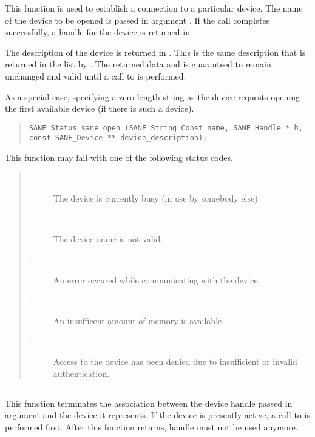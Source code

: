 \documentclass[11pt,DVIps]{report}
\begin{document}
This function is used to establish a connection to a particular
device.  The name of the device to be opened is passed in argument
.  If the call completes successfully, a handle for the
device is returned in .
\begin{changebar}
The description of the device
is returned in . This is the
same description that is returned in the list by .
The returned data  and  is guaranteed
to remain unchanged and valid until a call to 
is performed.
\end{changebar}
As a special case, specifying a zero-length string as the device requests
opening the first available device (if there is such a device).
\begin{quote}
\begin{verbatim}
SANE_Status sane_open (SANE_String_Const name, SANE_Handle * h,
const SANE_Device ** device_description);
\end{verbatim}
\end{quote}

This function may fail with one of the following status codes.
\begin{quote}
\begin{description}
\item[:] The device is currently
  busy (in use by somebody else).
\item[:] The device name is not valid.
\item[:] An error occured while
  communicating with the device.
\item[:] An insufficent amount of memory
  is available.
\item[:] Access to the device has
  been denied due to insufficient or invalid authentication.
\end{description}
\end{quote}


\subsection{}

This function terminates the association between the device handle
passed in argument  and the device it represents.  If the
device is presently active, a call to  is
performed first.  After this function returns, handle  must
not be used anymore.
\end{document}
